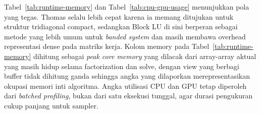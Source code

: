 \documentclass[12pt,a4paper]{article}
\begin{document}
\begin{table}[h]
\centering
\caption{Perbandingan runtime dan peak memory inti algoritma antara Block LU dan Thomas algorithm.}
\label{tab:runtime-memory}
\end{table}

Tabel~\ref{tab:runtime-memory} dan Tabel~\ref{tab:cpu-gpu-usage} menunjukkan pola yang tegas. Thomas selalu lebih cepat karena ia memang ditujukan untuk struktur tridiagonal compact, sedangkan Block LU di sini berperan sebagai metode yang lebih umum untuk \emph{banded system} dan masih membawa overhead representasi dense pada matriks kerja. Kolom memory pada Tabel~\ref{tab:runtime-memory} dihitung sebagai \emph{peak core memory} yang dilacak dari array-array aktual yang masih hidup selama factorization dan solve, dengan view yang berbagi buffer tidak dihitung ganda sehingga angka yang dilaporkan merepresentasikan okupasi memori inti algoritma. Angka utilisasi CPU dan GPU tetap diperoleh dari \emph{batched profiling}, bukan dari satu eksekusi tunggal, agar durasi pengukuran cukup panjang untuk sampler.

\begin{table}[H]
\centering
\caption{Perbandingan CPU usage dan GPU usage antara Block LU dan Thomas algorithm.}
\label{tab:cpu-gpu-usage}
\end{table}
\end{document}
